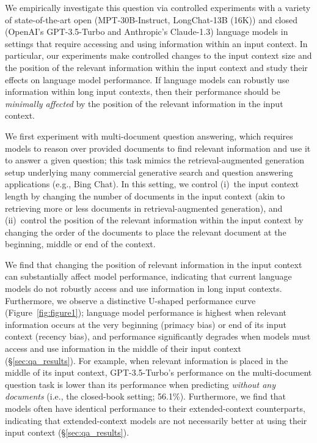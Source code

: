 We empirically investigate this question via controlled experiments with a variety of state-of-the-art open (MPT-30B-Instruct, LongChat-13B (16K)) and closed (OpenAI's GPT-3.5-Turbo and Anthropic's Claude-1.3) language models in settings that require accessing and using information within an input context. In particular, our experiments make controlled changes to the input context size and the position of the relevant information within the input context and study their effects on language model performance. If language models can robustly use information within long input contexts, then their performance should be \emph{minimally affected} by the position of the relevant information in the input context.

We first experiment with multi-document question answering, which requires models to reason over provided documents to find relevant information and use it to answer a given question; this task mimics the retrieval-augmented generation setup underlying many commercial generative search and question answering applications (e.g., Bing Chat). In this setting, we control (i)~the input context length by changing the number of documents in the input context (akin to retrieving more or less documents in retrieval-augmented generation), and (ii)~control the position of the relevant information within the input context by changing the order of the documents to place the relevant document at the beginning, middle or end of the context.

We find that changing the position of relevant information in the input context can substantially affect model performance, indicating that current language models do not robustly access and use information in long input contexts. Furthermore, we observe a distinctive U-shaped performance curve (Figure~\ref{fig:figure1}); language model performance is highest when relevant information occurs at the very beginning (primacy bias) or end of its input context (recency bias), and performance significantly degrades when models must access and use information in the middle of their input context (\S\ref{sec:qa_results}).
For example, when relevant information is placed in the middle of its input context, GPT-3.5-Turbo's performance on the multi-document question task is lower than its performance when predicting \emph{without any documents} (i.e., the closed-book setting; 56.1\%).
Furthermore, we find that models often have identical performance to their extended-context counterparts, indicating that extended-context models are not necessarily better at using their input context (\S\ref{sec:qa_results}).

